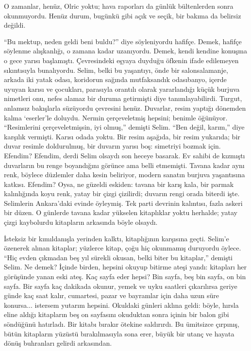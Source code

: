 \documentclass[a5paper,12pt]{scrbook}
\begin{document}
O zamanlar, henüz, Olric yoktu; hava raporları da günlük bültenlerden sonra
okunmuyordu. Henüz durum, bugünkü gibi açık ve seçik, bir bakıma da belirsiz
değildi.

``Bu mektup, neden geldi beni buldu?'' diye söyleniyordu hafifçe. Demek, hafifçe
söylenme alışkanlığı, o zamana kadar uzanıyordu. Demek, kendi kendine konuşma o
gece yarısı başlamıştı. Çevresindeki eşyaya duyduğu öfkenin ifade edilemeyen
sıkıntısıyla bunalıyordu. Selim, belki bu yaşantıyı, önde bir salonsalamanje,
arkada iki yatak odası, koridorun sağında mutfaksandık odasıbanyo, içerde uyuyan
karısı ve çocukları, parasıyla orantılı olarak yararlandığı küçük burjuva
nimetleri onu, nefes alamaz bir duruma getirmişti diye tanımlayabilirdi. Turgut,
anlamsız bakışlarla süzüyordu çevresini henüz. Duvarlar, resim yaptığı dönemden
kalma `eserler'le doluydu. Nermin çerçeveletmiş hepsini; benimle öğünüyor.
``Resimlerini çerçeveletmişsin, iyi olmuş,'' demişti Selim. ``Ben değil, karım,''
diye karşılık vermişti. Karısı odada yoktu. Bir resim aşağıda, bir resim
yukarıda; bir duvar resimle doldurulmuş, bir duvarın yarısı boş: simetriyi
bozmak için. Efendim? Efendim, derdi Selim olsaydı son heceye basarak. Ev sahibi
de kızmıştı duvarların bu renge boyandığını görünce ama belli etmemişti. Tavana
kadar aynı renk, böylece düzlemler daha kesin beliriyor, modern sanatın burjuva
yaşantısına katkısı. Efendim? Oysa, ne güzeldi eskiden: tavana bir karış kala,
bir parmak kalınlığında koyu renk, yatay bir çizgi çizilirdi; duvarın rengi
orada biterdi işte. Selimlerin Ankara'daki evinde öyleymiş. Tek parti devrinin
kalıntısı, fazla askeri bir düzen. O günlerde tavana kadar yükselen kitaplıklar
yoktu herhalde; yatay çizgi kaybolurdu kitapların arkasında böyle olsaydı.

İsteksiz bir kımıldanışla yerinden kalktı, kitaplığının karşısına geçti. Selim'e
özenerek alınan kitaplar; yüzlerce kitap, çoğu hiç okunmamış duruyordu öylece.
``Hiç evden çıkmadan beş yıl sürekli okusan, belki biter bu kitaplar,'' demişti
Selim. Ne demek? İçinde birden, hepsini okuyup bitirme ateşi yandı: kitapları
her görüşünde yanan eski ateş. Kaç sayfa eder hepsi? Bin sayfa, beş bin sayfa,
on bin sayfa. Bir sayfa kaç dakikada okunur, yemek ve uyku saatleri çıkarılırsa
geriye günde kaç saat kalır, cumartesi, pazar ve bayramlar için daha uzun süre
konursa... istersem yutarım hepsini. Okuldaki günleri aklına geldi: böyle,
hırsla eline aldığı kitapların beş on sayfasını okuduktan sonra içinin bir balon
gibi söndüğünü hatırladı. Bir kitabı bırakır ötekine saldırırdı. Bu ümitsizce
çırpınış, bütün kitapların yüzüstü bırakılmasıyla sona erer, büyük bir utanç ve
hayata dönüş buhranları gelirdi arkasından.
\end{document}
